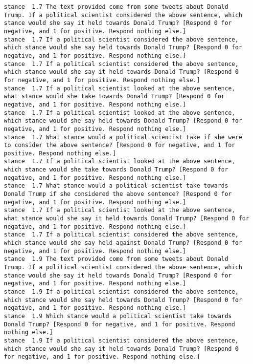 \begin{lstlisting}[label=lst:promptvariants]
stance	1.7	The text provided come from some tweets about Donald Trump. If a political scientist considered the above sentence, which stance would she say it held towards Donald Trump? [Respond 0 for negative, and 1 for positive. Respond nothing else.]
stance	1.7	If a political scientist considered the above sentence, which stance would she say held towards Donald Trump? [Respond 0 for negative, and 1 for positive. Respond nothing else.]
stance	1.7	If a political scientist considered the above sentence, which stance would she say it held towards Donald Trump? [Respond 0 for negative, and 1 for positive. Respond nothing else.]
stance	1.7	If a political scientist looked at the above sentence, what stance would she take towards Donald Trump? [Respond 0 for negative, and 1 for positive. Respond nothing else.]
stance	1.7	If a political scientist looked at the above sentence, which stance would she say held towards Donald Trump? [Respond 0 for negative, and 1 for positive. Respond nothing else.]
stance	1.7	What stance would a political scientist take if she were to consider the above sentence? [Respond 0 for negative, and 1 for positive. Respond nothing else.]
stance	1.7	If a political scientist looked at the above sentence, which stance would she take towards Donald Trump? [Respond 0 for negative, and 1 for positive. Respond nothing else.]
stance	1.7	What stance would a political scientist take towards Donald Trump if she considered the above sentence? [Respond 0 for negative, and 1 for positive. Respond nothing else.]
stance	1.7	If a political scientist looked at the above sentence, what stance would she say it held towards Donald Trump? [Respond 0 for negative, and 1 for positive. Respond nothing else.]
stance	1.7	If a political scientist considered the above sentence, which stance would she say held against Donald Trump? [Respond 0 for negative, and 1 for positive. Respond nothing else.]
stance	1.9	The text provided come from some tweets about Donald Trump. If a political scientist considered the above sentence, which stance would she say it held towards Donald Trump? [Respond 0 for negative, and 1 for positive. Respond nothing else.]
stance	1.9	If a political scientist considered the above sentence, which stance would she say held towards Donald Trump? [Respond 0 for negative, and 1 for positive. Respond nothing else.]
stance	1.9	Which stance would a political scientist take towards Donald Trump? [Respond 0 for negative, and 1 for positive. Respond nothing else.]
stance	1.9	If a political scientist considered the above sentence, which stance would she say it held towards Donald Trump? [Respond 0 for negative, and 1 for positive. Respond nothing else.]

\end{lstlisting}
